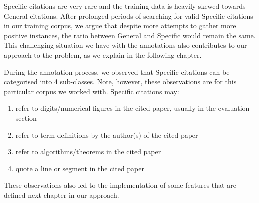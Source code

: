 Specific citations are very rare and the training data is heavily skewed towards General citations. After prolonged periods of searching for valid Specific citations in our training corpus, we argue that despite more attempts to gather more positive instances, the ratio between General and Specific would remain the same. This challenging situation we have with the annotations also contributes to our approach to the problem, as we explain in the following chapter.

During the annotation process, we observed that Specific citations can be categorised into 4 sub-classes. Note, however, these observations are for this particular corpus we worked with. Specific citations may:
\begin{enumerate}
\item refer to digits/numerical figures in the cited paper, usually in the evaluation section
\item refer to term definitions by the author(s) of the cited paper
\item refer to algorithms/theorems in the cited paper
\item quote a line or segment in the cited paper
\end{enumerate}
These observations also led to the implementation of some features that are defined next chapter in our approach.
